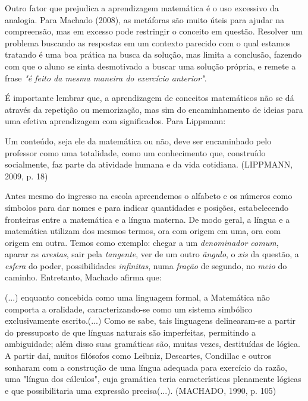\documentclass[brasil]{abnt}
\begin{document}
    Outro fator que prejudica a aprendizagem matemática é o uso excessivo da analogia. Para Machado (2008), as metáforas são muito úteis para ajudar na compreensão, mas em excesso pode restringir o
    conceito em questão. Resolver um problema buscando as respostas em um contexto parecido com o qual estamos tratando é uma boa prática na busca da solução, mas limita a conclusão, fazendo com que o
    aluno se sinta desmotivado a buscar uma solução própria, e remete a frase \textit{"é feito da mesma maneira do exercício anterior"}.   
    
    É importante lembrar que, a aprendizagem de conceitos matemáticos não se dá através da repetição ou memorização, mas sim do encaminhamento de ideias para uma efetiva aprendizagem com significados. 
    Para Lippmann:
    \begin{citacao} Um conteúdo, seja ele da matemática ou não, deve ser encaminhado pelo professor como uma totalidade, como um conhecimento que, construído socialmente, faz parte da atividade humana e
					da vida cotidiana. (LIPPMANN, 2009, p. 18)
    \end{citacao} 
    
	Antes mesmo do ingresso na escola apreendemos o alfabeto e os números como símbolos para dar nomes e para indicar quantidades 
	e posições, estabelecendo fronteiras entre a matemática e a língua materna. De modo geral, a língua e a matemática utilizam dos mesmos termos, 
	ora com origem em uma, ora com origem em outra. Temos como exemplo: chegar a um \textit{denominador comum}, aparar as \textit{arestas}, sair pela \textit{tangente}, 
	ver de um outro \textit{ângulo}, o \textit{xis} da questão, a \textit{esfera} do poder, possibilidades \textit{infinitas}, numa \textit{fração} de segundo, no \textit{meio} do caminho.
	Entretanto, Machado afirma que:
	 
	\begin{citacao}(...) enquanto concebida como uma linguagem formal, a Matemática não comporta a oralidade, caracterizando-se como um sistema simbólico exclusivamente escrito.(...) 
					Como se sabe, tais linguagens delinearam-se a partir do pressuposto de que línguas naturais são imperfeitas, permitindo a ambiguidade; além disso suas gramáticas são, muitas vezes, 
					destituídas de lógica. A partir daí, muitos filósofos como Leibniz, Descartes, Condillac e outros sonharam com a construção de uma língua adequada para exercício da razão, uma "língua 
					dos cálculos", cuja gramática teria características plenamente lógicas e que possibilitaria uma expressão precisa(...). (MACHADO, 1990, p. 105)
	\end{citacao}
	
\end{document}
